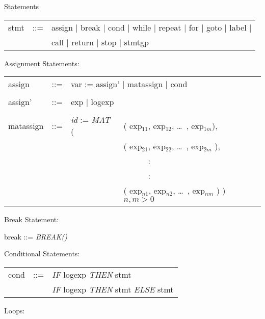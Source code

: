 \begin{describe}{Statements}
\begin{tabular}{lll}
stmt & ::= & assign  $\mid$  break  $\mid$  cond  $\mid$  while $\mid$
           repeat  $\mid$  for  $\mid$  goto  $\mid$  label $\mid$ \\
& &   call  $\mid$  return  $\mid$  stop  $\mid$  stmtgp \\
\end{tabular}

Assignment Statements:

\begin{tabular}{llll}
assign & ::= & \multicolumn{2}{l}{var := assign'  $\mid$  matassign $\mid$ cond}\\
& & & \\
assign' & ::= & \multicolumn{2}{l}{exp  $\mid$  logexp}\\
& & & \\
matassign & ::= & {\it id} := {\it MAT\/} ( &( exp$_{11}$, exp$_{12}$, \dots\ , exp$_{1m}$),\\
 & & &( exp$_{21}$, exp$_{22}$, \dots\ , exp$_{2m}$ ),\\
 & & & \ \ \ \ \ \ :\\
 & & & \ \ \ \ \ \ :\\
 & & &( exp$_{n1}$, exp$_{n2}$, \dots\ , exp$_{nm}$ ) ) $n,m > 0$ \\
\end{tabular}

Break Statement:

break  ::= {\it BREAK()}

Conditional Statements:

\begin{tabular}{lll}
cond & ::= & {\it IF\/} logexp {\it THEN\/} stmt\\
& & {\it IF\/} logexp {\it THEN\/} stmt {\it ELSE\/} stmt\\
\end{tabular}

Loops:


\end{describe}

